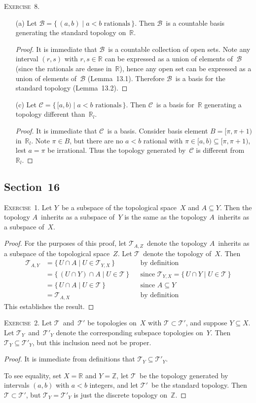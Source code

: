 \documentclass[letterpaper]{article}
\newcommand{\exercise}[1]{\goodbreak\noindent\textsc{Exercise~{#1}.}}
\newcommand{\Z}{\mathbb{Z}}
\newcommand{\R}{\mathbb{R}}
\newcommand{\RL}{\R_l}
\newcommand{\B}{\mathcal{B}}
\newcommand{\C}{\mathcal{C}}
\newcommand{\T}{\mathcal{T}}
\newcommand{\sect}{\cap}
\begin{document}
\exercise{8}
\begin{enumerate}
\item[(a)] Let $\B=\{\,(a,b)\mid a<b\text{ rationals}\,\}$. Then $\B$~is a countable basis generating the standard topology on~$\R$.
\begin{proof}
It is immediate that $\B$~is a countable collection of open sets. Note any interval $(r,s)$ with $r,s\in\R$ can be expressed as a union of elements of~$\B$ (since the rationals are dense in~$\R$), hence any open set can be expressed as a union of elements of~$\B$ (Lemma~13.1). Therefore $\B$~is a basis for the standard topology (Lemma~13.2).
\end{proof}
\item[(c)] Let $\C=\{\,[a,b)\mid a<b\text{ rationals}\,\}$. Then $\C$~is a basis for~$\R$ generating a topology different than~$\RL$.
\begin{proof}
It is immediate that $\C$~is a basis. Consider basis element $B=[\pi,\pi+1)$ in~$\RL$. Note $\pi\in B$, but there are no $a<b$ rational with $\pi\in[a,b)\subseteq[\pi,\pi+1)$, lest $a=\pi$ be irrational. Thus the topology generated by~$\C$ is different from~$\RL$.
\end{proof}
\end{enumerate}

\subsection*{Section~16}
\exercise{1}
Let $Y$~be a subspace of the topological space~$X$ and $A\subseteq Y$. Then the topology $A$~inherits as a subspace of~$Y$ is the same as the topology $A$~inherits as a subspace of~$X$.
\begin{proof}
For the purposes of this proof, let $\T_{A,Z}$~denote the topology $A$~inherits as a subspace of the topological space~$Z$. Let $\T$~denote the topology of~$X$. Then
\begin{align*}
\T_{A,Y}&=\{\,U\sect A\mid U\in\T_{Y,X}\,\}&&\text{by definition}\\
	&=\{\,(U\sect Y)\sect A\mid U\in\T\,\}&&\text{since }\T_{Y,X}=\{\,U\sect Y\mid U\in\T\,\}\\
	&=\{\,U\sect A\mid U\in\T\,\}&&\text{since }A\subseteq Y\\
	&=\T_{A,X}&&\text{by definition}
\end{align*}
This establishes the result.
\end{proof}

\exercise{2}
Let $\T$~and~$\T'$ be topologies on~$X$ with $\T\subset\T'$, and suppose $Y\subseteq X$. Let $\T_Y$~and~$\T'_Y$ denote the corresponding subspace topologies on~$Y$. Then $\T_Y\subseteq\T'_Y$, but this inclusion need not be proper.
\begin{proof}
It is immediate from definitions that $\T_Y\subseteq\T'_Y$.

To see equality, set $X=\R$ and $Y=\Z$, let $\T$~be the topology generated by intervals $(a,b)$ with $a<b$ integers, and let $\T'$~be the standard topology. Then $\T\subset\T'$, but $\T_Y=\T'_Y$ is just the discrete topology on~$\Z$.
\end{proof}
\end{document}
